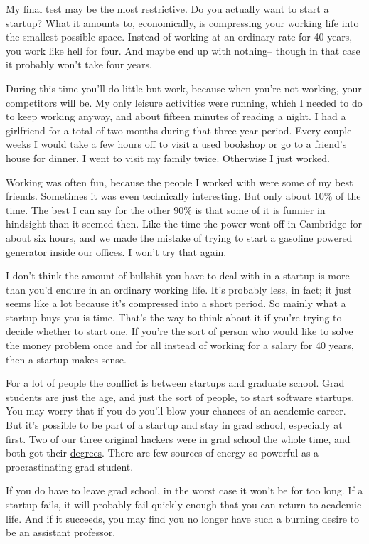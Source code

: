 \documentclass[12pt]{book}
\begin{document}
My final test may be the most restrictive. Do you actually want to start
a startup? What it amounts to, economically, is compressing your working
life into the smallest possible space. Instead of working at an ordinary
rate for 40 years, you work like hell for four. And maybe end up with
nothing-- though in that case it probably won't take four years.

During this time you'll do little but work, because when you're not
working, your competitors will be. My only leisure activities were
running, which I needed to do to keep working anyway, and about fifteen
minutes of reading a night. I had a girlfriend for a total of two months
during that three year period. Every couple weeks I would take a few
hours off to visit a used bookshop or go to a friend's house for dinner.
I went to visit my family twice. Otherwise I just worked.

Working was often fun, because the people I worked with were some of my
best friends. Sometimes it was even technically interesting. But only
about 10\% of the time. The best I can say for the other 90\% is that
some of it is funnier in hindsight than it seemed then. Like the time
the power went off in Cambridge for about six hours, and we made the
mistake of trying to start a gasoline powered generator inside our
offices. I won't try that again.

I don't think the amount of bullshit you have to deal with in a startup
is more than you'd endure in an ordinary working life. It's probably
less, in fact; it just seems like a lot because it's compressed into a
short period. So mainly what a startup buys you is time. That's the way
to think about it if you're trying to decide whether to start one. If
you're the sort of person who would like to solve the money problem once
and for all instead of working for a salary for 40 years, then a startup
makes sense.

For a lot of people the conflict is between startups and graduate
school. Grad students are just the age, and just the sort of people, to
start software startups. You may worry that if you do you'll blow your
chances of an academic career. But it's possible to be part of a startup
and stay in grad school, especially at first. Two of our three original
hackers were in grad school the whole time, and both got their
\href{tlbphd.html}{degrees}. There are few sources of energy so powerful
as a procrastinating grad student.

If you do have to leave grad school, in the worst case it won't be for
too long. If a startup fails, it will probably fail quickly enough that
you can return to academic life. And if it succeeds, you may find you no
longer have such a burning desire to be an assistant professor.
\end{document}
